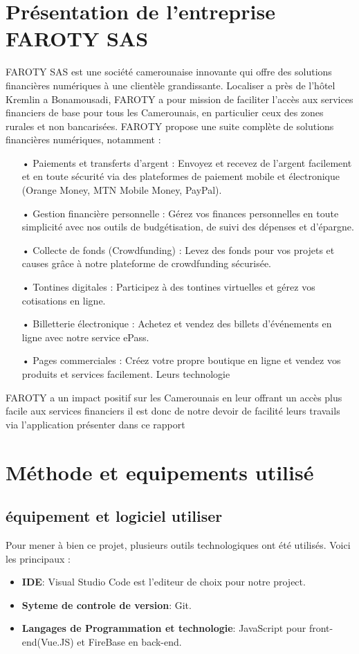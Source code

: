 \documentclass[a4paper,12pt]{report}
\begin{document}
\chapter{Présentation de l'entreprise FAROTY SAS} 
FAROTY SAS est une société camerounaise innovante qui offre des solutions financières numériques à une clientèle grandissante. Localiser a près de l’hôtel Kremlin a Bonamousadi, FAROTY a pour mission de faciliter l'accès aux services financiers de base pour tous les Camerounais, en particulier ceux des zones rurales et non bancarisées.
FAROTY propose une suite complète de solutions financières numériques, notamment :
\begin{itemize}
\item[•] Paiements et transferts d'argent : Envoyez et recevez de l'argent facilement et en toute sécurité via des plateformes de paiement mobile et électronique (Orange Money, MTN Mobile Money, PayPal). 
\item[•] Gestion financière personnelle : Gérez vos finances personnelles en toute simplicité avec nos outils de budgétisation, de suivi des dépenses et d'épargne. 
\item[•] Collecte de fonds (Crowdfunding) : Levez des fonds pour vos projets et causes grâce à notre plateforme de crowdfunding sécurisée. 
\item[•] Tontines digitales : Participez à des tontines virtuelles et gérez vos cotisations en ligne. 
\item[•] Billetterie électronique : Achetez et vendez des billets d'événements en ligne avec notre service ePass. 
\item[•] Pages commerciales : Créez votre propre boutique en ligne et vendez vos produits et services facilement. 
Leurs technologie
\end{itemize} 
FAROTY a un impact positif sur les Camerounais en leur offrant un accès plus facile aux services financiers il est donc de notre devoir de facilité leurs travails via l'application présenter dans ce rapport

\chapter{Méthode et equipements utilisé}
\section{équipement et logiciel utiliser}

Pour mener à bien ce projet, plusieurs outils technologiques ont été utilisés. Voici les principaux :
\begin{itemize}
\item\textbf{IDE}: Visual Studio Code est l'editeur de choix pour notre project.
\item\textbf{Syteme de controle de version}: Git.
\item\textbf{Langages de Programmation et technologie}: JavaScript pour front-end(Vue.JS) et FireBase en back-end.
\end{itemize}
\end{document}
